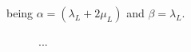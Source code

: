 being $ \alpha = (\lambda_L + 2\mu_L) $ and $ \beta = \lambda_L $. 




\begin{figure}[h!]
	\centering
	\caption{... }
	\def\svgwidth{\columnwidth}  
	  
	\label{fig:ddcm_convergence_elasticity}  
\end{figure}


\cleardoublepage

